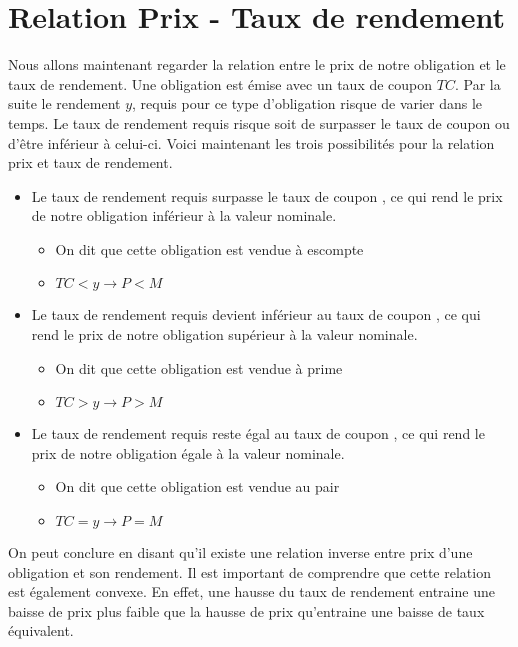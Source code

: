 \documentclass[12pt]{article}
\begin{document}
\section{Relation Prix - Taux de rendement}
Nous allons maintenant regarder la relation entre le prix de notre obligation et le taux de rendement. Une obligation est émise avec un taux de coupon $TC$. Par la suite le rendement $y$, requis pour ce type d'obligation risque de varier dans le temps. Le taux de rendement requis risque soit de surpasser le taux de coupon ou d'être inférieur à celui-ci. Voici maintenant les trois possibilités pour la relation prix et taux de rendement. 
\begin{itemize}
\item Le taux de rendement requis surpasse le taux de coupon , ce qui rend le prix de notre obligation inférieur à la valeur nominale. 
\begin{itemize}
\item On dit que cette obligation est vendue à escompte 
\item $TC < y \rightarrow P < M$
\end{itemize}
\item Le taux de rendement requis devient inférieur au taux de coupon , ce qui rend le prix de notre obligation supérieur à la valeur nominale. 
\begin{itemize}
\item On dit que cette obligation est vendue à prime
\item $TC > y \rightarrow P > M$
\end{itemize}
\item Le taux de rendement requis reste égal au taux de coupon , ce qui rend le prix de notre obligation égale à la valeur nominale. 
\begin{itemize}
\item On dit que cette obligation est vendue au pair
\item $TC = y \rightarrow P = M$
\end{itemize}
\end{itemize}
On peut conclure en disant qu'il existe une relation inverse entre prix d'une obligation et son rendement. Il est important de comprendre que cette relation est également convexe. En effet, une hausse du taux de rendement entraine une baisse de prix plus faible que la hausse de prix qu'entraine une baisse de taux équivalent.
\end{document}
